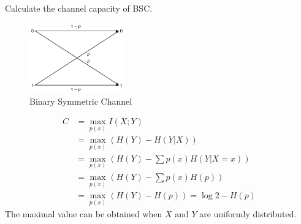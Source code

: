 \begin{exercise}[BSC]{Calculate the channel capacity of BSC.
  \begin{figure}[H]
    \centering
    \includegraphics[height=3cm]{img/6-1.png}
    \caption{Binary Symmetric Channel}
    \label{fig:bsc}
  \end{figure}}
  \begin{solution}
  \begin{equation}\begin{aligned}
    C &=\max_{p(x)} I(X ; Y) \\
    &=\max_{p(x)} (H(Y)-H(Y | X) )\\
    &=\max_{p(x)} (H(Y)-\sum p(x) H(Y | X=x) )\\
    &=\max_{p(x)} (H(Y)-\sum p(x) H(p)) \\
    &=\max_{p(x)} (H(Y) - H(p)) = \log 2 - H(p)
    \end{aligned}\end{equation}
  The maximal value can be obtained when $X$ and $Y$ are uniformly distributed.
  \end{solution}
  \label{ex6-1}
\end{exercise}


